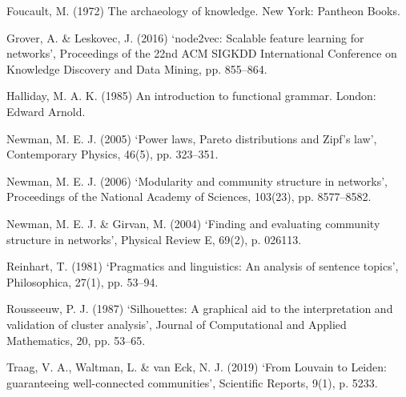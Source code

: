 \documentclass[11pt]{article}
\begin{document}
Foucault, M. (1972) The archaeology of knowledge. New York: Pantheon Books.


Grover, A. \& Leskovec, J. (2016) `node2vec: Scalable feature learning for networks', Proceedings of the 22nd ACM SIGKDD International Conference on Knowledge Discovery and Data Mining, pp. 855--864.


Halliday, M. A. K. (1985) An introduction to functional grammar. London: Edward Arnold.


Newman, M. E. J. (2005) `Power laws, Pareto distributions and Zipf's law', Contemporary Physics, 46(5), pp. 323--351.


Newman, M. E. J. (2006) `Modularity and community structure in networks', Proceedings of the National Academy of Sciences, 103(23), pp. 8577--8582.


Newman, M. E. J. \& Girvan, M. (2004) `Finding and evaluating community structure in networks', Physical Review E, 69(2), p. 026113.


Reinhart, T. (1981) `Pragmatics and linguistics: An analysis of sentence topics', Philosophica, 27(1), pp. 53--94.


Rousseeuw, P. J. (1987) `Silhouettes: A graphical aid to the interpretation and validation of cluster analysis', Journal of Computational and Applied Mathematics, 20, pp. 53--65.


Traag, V. A., Waltman, L. \& van Eck, N. J. (2019) `From Louvain to Leiden: guaranteeing well-connected communities', Scientific Reports, 9(1), p. 5233.
\end{document}
